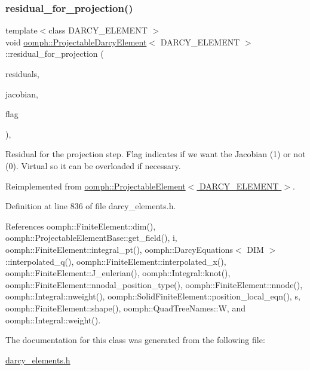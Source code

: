 \subsubsection{\texorpdfstring{residual\+\_\+for\+\_\+projection()}{residual\_for\_projection()}}
{\footnotesize\ttfamily template$<$class D\+A\+R\+C\+Y\+\_\+\+E\+L\+E\+M\+E\+NT $>$ \\
void \hyperlink{classoomph_1_1ProjectableDarcyElement}{oomph\+::\+Projectable\+Darcy\+Element}$<$ D\+A\+R\+C\+Y\+\_\+\+E\+L\+E\+M\+E\+NT $>$\+::residual\+\_\+for\+\_\+projection (\begin{DoxyParamCaption}\item[{\hyperlink{classoomph_1_1Vector}{Vector}$<$ double $>$ \&}]{residuals,  }\item[{\hyperlink{classoomph_1_1DenseMatrix}{Dense\+Matrix}$<$ double $>$ \&}]{jacobian,  }\item[{const unsigned \&}]{flag }\end{DoxyParamCaption})\hspace{0.3cm}{\ttfamily [inline]}, {\ttfamily [virtual]}}



Residual for the projection step. Flag indicates if we want the Jacobian (1) or not (0). Virtual so it can be overloaded if necessary. 



Reimplemented from \hyperlink{classoomph_1_1ProjectableElement_a1ff7a9207ec5e4fc2508e75064e136de}{oomph\+::\+Projectable\+Element$<$ D\+A\+R\+C\+Y\+\_\+\+E\+L\+E\+M\+E\+N\+T $>$}.



Definition at line 836 of file darcy\+\_\+elements.\+h.



References oomph\+::\+Finite\+Element\+::dim(), oomph\+::\+Projectable\+Element\+Base\+::get\+\_\+field(), i, oomph\+::\+Finite\+Element\+::integral\+\_\+pt(), oomph\+::\+Darcy\+Equations$<$ D\+I\+M $>$\+::interpolated\+\_\+q(), oomph\+::\+Finite\+Element\+::interpolated\+\_\+x(), oomph\+::\+Finite\+Element\+::\+J\+\_\+eulerian(), oomph\+::\+Integral\+::knot(), oomph\+::\+Finite\+Element\+::nnodal\+\_\+position\+\_\+type(), oomph\+::\+Finite\+Element\+::nnode(), oomph\+::\+Integral\+::nweight(), oomph\+::\+Solid\+Finite\+Element\+::position\+\_\+local\+\_\+eqn(), s, oomph\+::\+Finite\+Element\+::shape(), oomph\+::\+Quad\+Tree\+Names\+::W, and oomph\+::\+Integral\+::weight().



The documentation for this class was generated from the following file\+:\begin{DoxyCompactItemize}
\item 
\hyperlink{darcy__elements_8h}{darcy\+\_\+elements.\+h}\end{DoxyCompactItemize}
